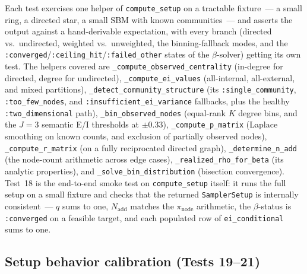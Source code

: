 \documentclass[11pt]{article}
\begin{document}
Each test exercises one helper of \texttt{compute\_setup} on a tractable fixture~--- a small ring, a directed star, a small SBM with known communities~--- and asserts the output against a hand-derivable expectation, with every branch (directed vs.\ undirected, weighted vs.\ unweighted, the binning-fallback modes, and the \texttt{:converged}/\texttt{:ceiling\_hit}/\texttt{:failed\_other} states of the $\beta$-solver) getting its own test. The helpers covered are \texttt{\_compute\_observed\_centrality} (in-degree for directed, degree for undirected), \texttt{\_compute\_ei\_values} (all-internal, all-external, and mixed partitions), \texttt{\_detect\_community\_structure} (its \texttt{:single\_community}, \texttt{:too\_few\_nodes}, and \texttt{:insufficient\_ei\_variance} fallbacks, plus the healthy \texttt{:two\_dimensional} path), \texttt{\_bin\_observed\_nodes} (equal-rank $K$ degree bins, and the $J=3$ semantic E/I thresholds at $\pm 0.33$), \texttt{\_compute\_p\_matrix} (Laplace smoothing on known counts, and exclusion of partially observed nodes), \texttt{\_compute\_r\_matrix} (on a fully reciprocated directed graph), \texttt{\_determine\_n\_add} (the node-count arithmetic across edge cases), \texttt{\_realized\_rho\_for\_beta} (its analytic properties), and \texttt{\_solve\_bin\_distribution} (bisection convergence). Test~18 is the end-to-end smoke test on \texttt{compute\_setup} itself: it runs the full setup on a small fixture and checks that the returned \texttt{SamplerSetup} is internally consistent~--- $q$ sums to one, $N_{\text{add}}$ matches the $\pi_{\text{node}}$ arithmetic, the $\beta$-status is \texttt{:converged} on a feasible target, and each populated row of \texttt{ei\_conditional} sums to one.

\subsection{Setup behavior calibration (Tests 19--21)}
\end{document}
